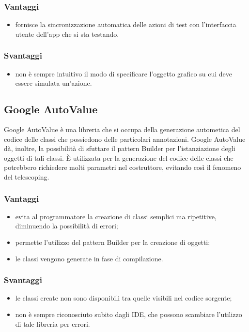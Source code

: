 \documentclass[../Tesi.tex]{subfiles}
\begin{document}
		\subsubsection{Vantaggi}
			\begin{itemize}
				\item fornisce la sincronizzazione automatica delle azioni di test con l'interfaccia utente dell'app che si sta testando.
			\end{itemize}
		\subsubsection{Svantaggi}
			\begin{itemize}
				\item non è sempre intuitivo il modo di specificare l'oggetto grafico su cui deve essere simulata un'azione.
			\end{itemize}
	\subsection{Google AutoValue}
		Google AutoValue è una libreria che si occupa della generazione autometica del codice delle classi che possiedono delle particolari annotazioni. Google AutoValue dà, inoltre, la possibilità di sfuttare il pattern Builder per l'istanziazione degli oggetti di tali classi. È utilizzata per la generazione del codice delle classi che potrebbero richiedere molti parametri nel costruttore, evitando così il fenomeno del telescoping. 
		\subsubsection{Vantaggi}
			\begin{itemize}	
				\item evita al programmatore la creazione di classi semplici ma ripetitive, diminuendo la possibilità di errori;
				\item permette l'utilizzo del pattern Builder per la creazione di oggetti;
				\item le classi vengono generate in fase di compilazione.
			\end{itemize}
		\subsubsection{Svantaggi}
			\begin{itemize}
				\item le classi create non sono disponibili tra quelle visibili nel codice sorgente;
				\item non è sempre riconosciuto subito dagli IDE, che possono scambiare l'utilizzo di tale libreria per errori.
			\end{itemize}
\end{document}
